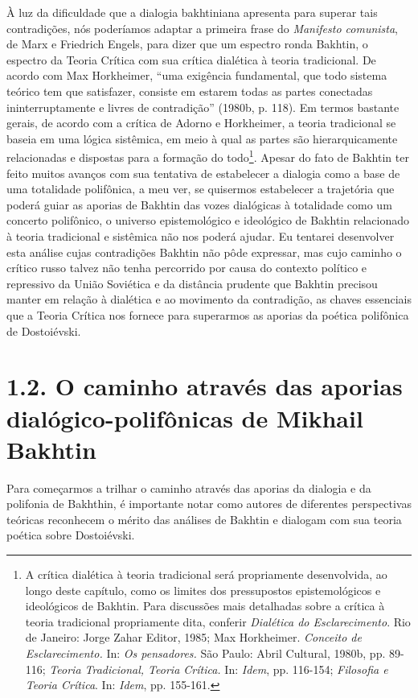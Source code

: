 À luz da dificuldade que a dialogia bakhtiniana apresenta para superar
tais contradições, nós poderíamos adaptar a primeira frase do
\emph{Manifesto comunista}, de Marx e Friedrich Engels, para dizer que
um espectro ronda Bakhtin, o espectro da Teoria Crítica com sua crítica
dialética à teoria tradicional. De acordo com Max Horkheimer, ``uma
exigência fundamental, que todo sistema teórico tem que satisfazer,
consiste em estarem todas as partes conectadas ininterruptamente e
livres de contradição'' (1980b, p. 118). Em termos bastante gerais, de
acordo com a crítica de Adorno e Horkheimer, a teoria tradicional se
baseia em uma lógica sistêmica, em meio à qual as partes são
hierarquicamente relacionadas e dispostas para a formação do
todo\footnote{A crítica dialética à teoria tradicional será propriamente
  desenvolvida, ao longo deste capítulo, como os limites dos
  pressupostos epistemológicos e ideológicos de Bakhtin. Para discussões
  mais detalhadas sobre a crítica à teoria tradicional propriamente
  dita, conferir \emph{Dialética do Esclarecimento}. Rio de Janeiro:
  Jorge Zahar Editor, 1985; Max Horkheimer. \emph{Conceito de
  Esclarecimento.} In: \emph{Os pensadores.} São Paulo: Abril Cultural,
  1980b, pp. 89-116; \emph{Teoria Tradicional, Teoria Crítica.} In:
  \emph{Idem}, pp. 116-154; \emph{Filosofia e Teoria Crítica}. In:
  \emph{Idem}, pp. 155-161.}. Apesar do fato de Bakhtin ter feito muitos
avanços com sua tentativa de estabelecer a dialogia como a base de uma
totalidade polifônica, a meu ver, se quisermos estabelecer a trajetória
que poderá guiar as aporias de Bakhtin das vozes dialógicas à totalidade
como um concerto polifônico, o universo epistemológico e ideológico de
Bakhtin relacionado à teoria tradicional e sistêmica não nos poderá
ajudar. Eu tentarei desenvolver esta análise cujas contradições Bakhtin
não pôde expressar, mas cujo caminho o crítico russo talvez não tenha
percorrido por causa do contexto político e repressivo da União
Soviética e da distância prudente que Bakhtin precisou manter em relação
à dialética e ao movimento da contradição, as chaves essenciais que a
Teoria Crítica nos fornece para superarmos as aporias da poética
polifônica de Dostoiévski.

\section{1.2. O caminho através das aporias dialógico-polifônicas de Mikhail
Bakhtin}

Para começarmos a trilhar o caminho através das aporias da dialogia e da
polifonia de Bakhthin, é importante notar como autores de diferentes
perspectivas teóricas reconhecem o mérito das análises de Bakhtin e
dialogam com sua teoria poética sobre Dostoiévski.

